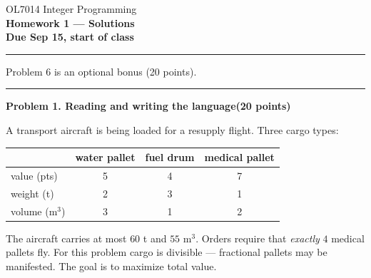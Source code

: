 \documentclass[10pt]{article}
\newcommand{\problem}[2]{%
  \par\bigskip
  {\color{ruleink}\rule{\textwidth}{1pt}}\par\nobreak\vspace{3pt}
  {\large\bfseries #2}\hfill{\normalsize\bfseries(#1 points)}\par\nobreak\vspace{4pt}}
\begin{document}
\begin{center}
  {\large OL7014 Integer Programming}\\[3pt]
  {\Large\bfseries Homework 1 --- Solutions}\\[4pt]
  {\small \textbf{Due Sep 15, start of class}}
\end{center}
\medskip\hrule\medskip

Problem 6 is an optional bonus (20 points).

\problem{20}{Problem 1. Reading and writing the language}

A transport aircraft is being loaded for a resupply flight. Three cargo types:

\begin{center}
\begin{tabular}{l|ccc}
              & water pallet & fuel drum & medical pallet \\ \hline
 value (pts)  & 5 & 4 & 7 \\
 weight (t)   & 2 & 3 & 1 \\
 volume (m$^3$) & 3 & 1 & 2 \\
\end{tabular}
\end{center}

The aircraft carries at most $60$ t and $55$ m$^3$. Orders require that \emph{exactly}
$4$ medical pallets fly. For this problem cargo is divisible --- fractional pallets may
be manifested. The goal is to maximize total value.
\end{document}

